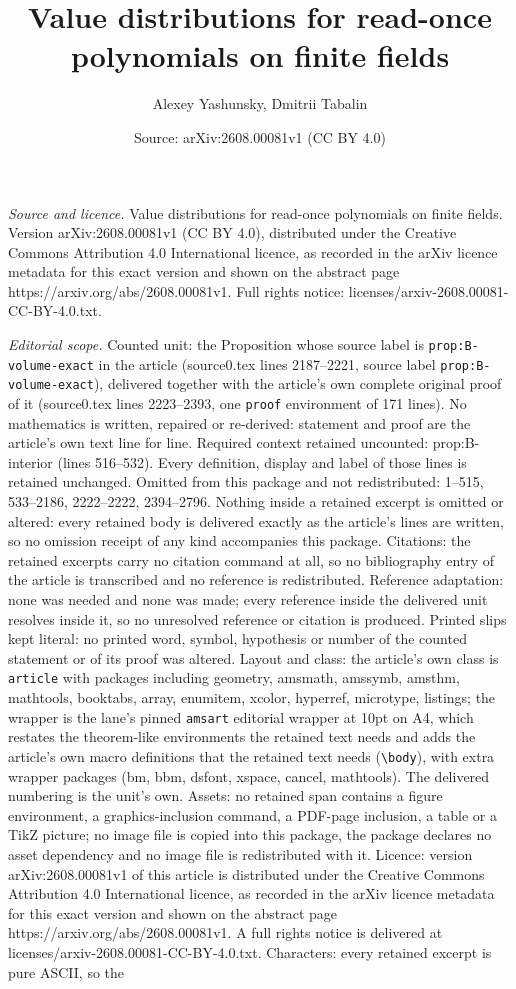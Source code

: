 \documentclass[10pt,a4paper]{amsart}
\title[Value distributions for read-once polynomials on finite fiel]{Value distributions for read-once polynomials on finite fields}
\author{Alexey Yashunsky, Dmitrii Tabalin}
\date{Source: arXiv:2608.00081v1 (CC BY 4.0)}
\begin{document}
\maketitle

\noindent\emph{Source and licence.} Value distributions for read-once polynomials on finite fields. Version arXiv:2608.00081v1 (CC BY 4.0), distributed under the Creative Commons Attribution 4.0 International licence, as recorded in the arXiv licence metadata for this exact version and shown on the abstract page https://arxiv.org/abs/2608.00081v1. Full rights notice: licenses/arxiv-2608.00081-CC-BY-4.0.txt.\par\smallskip

\noindent\textit{Editorial scope.} Counted unit: the Proposition whose source label is \texttt{prop:B-volume-exact} in the article (source0.tex lines 2187--2221, source label \texttt{prop:B-volume-exact}), delivered together with the article's own complete original proof of it (source0.tex lines 2223--2393, one \texttt{proof} environment of 171 lines). No mathematics is written, repaired or re-derived: statement and proof are the article's own text line for line. Required context retained uncounted: prop:B-interior (lines 516--532). Every definition, display and label of those lines is retained unchanged. Omitted from this package and not redistributed: 1--515, 533--2186, 2222--2222, 2394--2796. Nothing inside a retained excerpt is omitted or altered: every retained body is delivered exactly as the article's lines are written, so no omission receipt of any kind accompanies this package. Citations: the retained excerpts carry no citation command at all, so no bibliography entry of the article is transcribed and no reference is redistributed. Reference adaptation: none was needed and none was made; every reference inside the delivered unit resolves inside it, so no unresolved reference or citation is produced. Printed slips kept literal: no printed word, symbol, hypothesis or number of the counted statement or of its proof was altered. Layout and class: the article's own class is \texttt{article} with packages including geometry, amsmath, amssymb, amsthm, mathtools, booktabs, array, enumitem, xcolor, hyperref, microtype, listings; the wrapper is the lane's pinned \texttt{amsart} editorial wrapper at 10pt on A4, which restates the theorem-like environments the retained text needs and adds the article's own macro definitions that the retained text needs (\texttt{\textbackslash body}), with extra wrapper packages (bm, bbm, dsfont, xspace, cancel, mathtools). The delivered numbering is the unit's own. Assets: no retained span contains a figure environment, a graphics-inclusion command, a PDF-page inclusion, a table or a TikZ picture; no image file is copied into this package, the package declares no asset dependency and no image file is redistributed with it. Licence: version arXiv:2608.00081v1 of this article is distributed under the Creative Commons Attribution 4.0 International licence, as recorded in the arXiv licence metadata for this exact version and shown on the abstract page https://arxiv.org/abs/2608.00081v1. A full rights notice is delivered at licenses/arxiv-2608.00081-CC-BY-4.0.txt. Characters: every retained excerpt is pure ASCII, so the 
\end{document}
